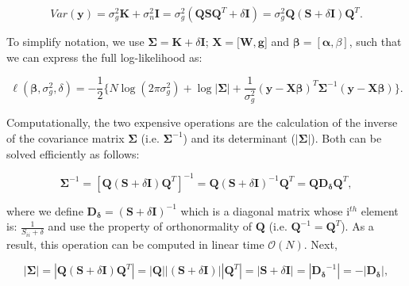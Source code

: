 \begin{equation}\label{eq:fast_lmm_full_covariance}
 Var(\mathbf{y}) = \sigma_g^2\mathbf{K} + \sigma_n^2\mathbf{I} = \sigma_g^2(\mathbf{Q}\mathbf{S}\mathbf{Q}^T + \delta\mathbf{I})= \sigma_g^2\mathbf{Q} (\mathbf{S} + \delta\mathbf{I})\mathbf{Q}^T.
\end{equation}

\vspace{4mm}

To simplify notation, we use $\boldsymbol{\Sigma} = \mathbf{K} + \delta\mathbf{I}$; $\mathbf{X} = [\mathbf{W}, \mathbf{g}$] and $\boldsymbol{\beta} = [\boldsymbol{\alpha}, \beta]$, such that we can express the full log-likelihood as:

\begin{equation} \label{eq:fast_lmm_log_likelihood}
 \ell(\boldsymbol{\beta}, \sigma_g^2, \delta) = -\frac{1}{2} \bigg\{N\log(2\pi\sigma_g^2) + \log{|\boldsymbol{\Sigma}|}+ \frac{1}{\sigma_g^2}(\mathbf{y}-\mathbf{X}\boldsymbol{\beta})^T\boldsymbol{\Sigma}^{-1}(\mathbf{y}-\mathbf{X}\boldsymbol{\beta}) \bigg\}. 
\end{equation}

Computationally, the two expensive operations are the calculation of the inverse of the covariance matrix $\boldsymbol{\Sigma}$ (i.e. $\boldsymbol{\Sigma}^{-1}$) and its determinant ($|\boldsymbol{\Sigma}|$). 
Both can be solved efficiently as follows:  

\begin{equation}\label{eq:fast_lmm_Sigma_inverse}
    \boldsymbol{\Sigma}^{-1} = [\mathbf{Q} (\mathbf{S} + \delta\mathbf{I})\mathbf{Q}^T]^{-1} = \mathbf{Q} (\mathbf{S} + \delta\mathbf{I})^{-1}\mathbf{Q}^T = \mathbf{Q} \mathbf{D_{\delta}}\mathbf{Q}^T,
\end{equation}

where we define $\mathbf{D_{\delta}}=(\mathbf{S} + \delta\mathbf{I})^{-1}$ which is a diagonal matrix whose i$^{th}$ element is: $\frac{1}{S_{ii} + \delta}$ and use the property of orthonormality of $\mathbf{Q}$ (i.e. $\mathbf{Q}^{-1} = \mathbf{Q}^T$).
As a result, this operation can be computed in linear time $\mathcal{O}(N)$. 
Next,

\begin{equation}\label{eq:fast_lmm_Sigma_determinant}
    |\boldsymbol{\Sigma}| = |\mathbf{Q} (\mathbf{S} + \delta\mathbf{I})\mathbf{Q}^T|= |\mathbf{Q}||(\mathbf{S} + \delta\mathbf{I})||\mathbf{Q}^T| = |\mathbf{S} + \delta\mathbf{I}| = |\mathbf{D_{\delta}}^{-1}| = - |\mathbf{D_{\delta}}|,
\end{equation}

